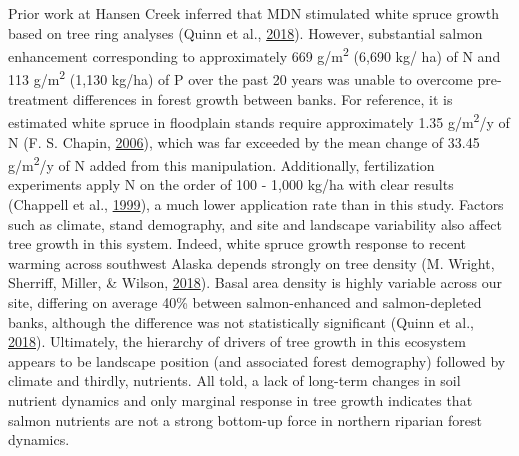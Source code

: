 \documentclass [11pt, proquest] {uwthesis}[2015/03/03]
\begin{document}
Prior work at Hansen Creek inferred that MDN stimulated white spruce
growth based on tree ring analyses (Quinn et al.,
\protect\hyperlink{ref-Quinn2018}{2018}). However, substantial salmon
enhancement corresponding to approximately 669 g/m\textsuperscript{2}
(6,690 kg/ ha) of N and 113 g/m\textsuperscript{2} (1,130 kg/ha) of P
over the past 20 years was unable to overcome pre-treatment differences
in forest growth between banks. For reference, it is estimated white
spruce in floodplain stands require approximately 1.35
g/m\textsuperscript{2}/y of N (F. S. Chapin,
\protect\hyperlink{ref-Chapin2006}{2006}), which was far exceeded by the
mean change of 33.45 g/m\textsuperscript{2}/y of N added from this
manipulation. Additionally, fertilization experiments apply N on the
order of 100 - 1,000 kg/ha with clear results (Chappell et al.,
\protect\hyperlink{ref-Chapell1999}{1999}), a much lower application
rate than in this study. Factors such as climate, stand demography, and
site and landscape variability also affect tree growth in this system.
Indeed, white spruce growth response to recent warming across southwest
Alaska depends strongly on tree density (M. Wright, Sherriff, Miller, \&
Wilson, \protect\hyperlink{ref-Wright2018}{2018}). Basal area density is
highly variable across our site, differing on average 40\% between
salmon-enhanced and salmon-depleted banks, although the difference was
not statistically significant (Quinn et al.,
\protect\hyperlink{ref-Quinn2018}{2018}). Ultimately, the hierarchy of
drivers of tree growth in this ecosystem appears to be landscape
position (and associated forest demography) followed by climate and
thirdly, nutrients. All told, a lack of long-term changes in soil
nutrient dynamics and only marginal response in tree growth indicates
that salmon nutrients are not a strong bottom-up force in northern
riparian forest dynamics.
\end{document}

